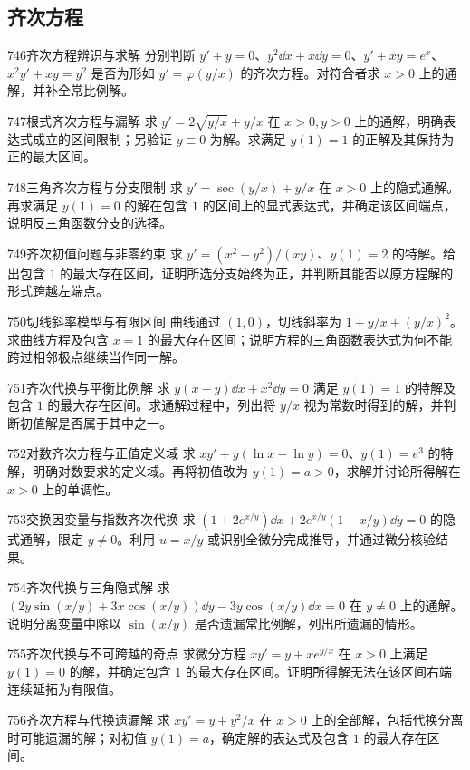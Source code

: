 \subsection{齐次方程}
\begin{exercise}{746}{齐次方程辨识与求解}
分别判断 $y'+y=0$、$y^2\dd x+x\dd y=0$、$y'+xy=e^x$、$x^2y'+xy=y^2$ 是否为形如 $y'=\varphi(y/x)$ 的齐次方程。对符合者求 $x>0$ 上的通解，并补全常比例解。
\end{exercise}
\begin{exercise}{747}{根式齐次方程与漏解}
求 $y'=2\sqrt{y/x}+y/x$ 在 $x>0,y>0$ 上的通解，明确表达式成立的区间限制；另验证 $y\equiv0$ 为解。求满足 $y(1)=1$ 的正解及其保持为正的最大区间。
\end{exercise}
\begin{exercise}{748}{三角齐次方程与分支限制}
求 $y'=\sec(y/x)+y/x$ 在 $x>0$ 上的隐式通解。再求满足 $y(1)=0$ 的解在包含 $1$ 的区间上的显式表达式，并确定该区间端点，说明反三角函数分支的选择。
\end{exercise}
\begin{exercise}{749}{齐次初值问题与非零约束}
求 $y'=(x^2+y^2)/(xy)$、$y(1)=2$ 的特解。给出包含 $1$ 的最大存在区间，证明所选分支始终为正，并判断其能否以原方程解的形式跨越左端点。
\end{exercise}
\begin{exercise}{750}{切线斜率模型与有限区间}
曲线通过 $(1,0)$，切线斜率为 $1+y/x+(y/x)^2$。求曲线方程及包含 $x=1$ 的最大存在区间；说明方程的三角函数表达式为何不能跨过相邻极点继续当作同一解。
\end{exercise}
\begin{exercise}{751}{齐次代换与平衡比例解}
求 $y(x-y)\dd x+x^2\dd y=0$ 满足 $y(1)=1$ 的特解及包含 $1$ 的最大存在区间。求通解过程中，列出将 $y/x$ 视为常数时得到的解，并判断初值解是否属于其中之一。
\end{exercise}
\begin{exercise}{752}{对数齐次方程与正值定义域}
求 $xy'+y(\ln x-\ln y)=0$、$y(1)=e^3$ 的特解，明确对数要求的定义域。再将初值改为 $y(1)=a>0$，求解并讨论所得解在 $x>0$ 上的单调性。
\end{exercise}
\begin{exercise}{753}{交换因变量与指数齐次代换}
求 $(1+2e^{x/y})\dd x+2e^{x/y}(1-x/y)\dd y=0$ 的隐式通解，限定 $y\ne0$。利用 $u=x/y$ 或识别全微分完成推导，并通过微分核验结果。
\end{exercise}
\begin{exercise}{754}{齐次代换与三角隐式解}
求 $(2y\sin(x/y)+3x\cos(x/y))\dd y-3y\cos(x/y)\dd x=0$ 在 $y\ne0$ 上的通解。说明分离变量中除以 $\sin(x/y)$ 是否遗漏常比例解，列出所遗漏的情形。
\end{exercise}
\begin{exercise}{755}{齐次代换与不可跨越的奇点}
求微分方程 $xy'=y+x e^{y/x}$ 在 $x>0$ 上满足 $y(1)=0$ 的解，并确定包含 $1$ 的最大存在区间。证明所得解无法在该区间右端连续延拓为有限值。
\end{exercise}
\begin{exercise}{756}{齐次方程与代换遗漏解}
求 $xy'=y+y^2/x$ 在 $x>0$ 上的全部解，包括代换分离时可能遗漏的解；对初值 $y(1)=a$，确定解的表达式及包含 $1$ 的最大存在区间。
\end{exercise}
